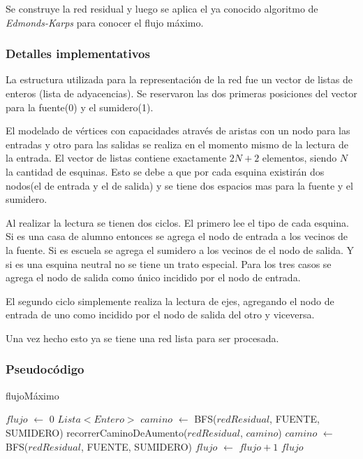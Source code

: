 Se construye la red residual y luego se aplica el ya conocido algoritmo de \textit{Edmonds-Karps} para conocer el flujo máximo.

\subsubsection*{Detalles implementativos}

La estructura utilizada para la representación de la red fue un vector de listas de enteros (lista de adyacencias). Se reservaron las dos primeras posiciones del vector para la fuente(0) y el sumidero(1).

El modelado de vértices con capacidades através de aristas con un nodo para las entradas y otro para las salidas se realiza en el momento mismo de la lectura de la entrada. El vector de listas contiene exactamente $2N + 2$ elementos, siendo $N$ la cantidad de esquinas. Esto se debe a que por cada esquina existirán dos nodos(el de entrada y el de salida) y se tiene dos espacios mas para la fuente y el sumidero.

Al realizar la lectura se tienen dos ciclos. El primero lee el tipo de cada esquina. Si es una casa de alumno entonces se agrega el nodo de entrada a los vecinos de la fuente. Si es escuela se agrega el sumidero a los vecinos de el nodo de salida. Y si es una esquina neutral no se tiene un trato especial. Para los tres casos se agrega el nodo de salida como único incidido por el nodo de entrada.

El segundo ciclo simplemente realiza la lectura de ejes, agregando el nodo de entrada de uno como incidido por el nodo de salida del otro y viceversa.

Una vez hecho esto ya se tiene una red lista para ser procesada.

\subsubsection*{Pseudocódigo}


\begin{algorithm}[]
	\caption{flujoMáximo}

	$flujo$ $\gets$ 0 \;
	$Lista<Entero>$ $camino$ $\gets$ BFS($redResidual$, FUENTE, SUMIDERO) \;
	 {
		recorrerCaminoDeAumento($redResidual$, $camino$) \;
		$camino$ $\gets$ BFS($redResidual$, FUENTE, SUMIDERO) \;
		$flujo$ $\gets$ $flujo + 1$ \;
	}
	\Return $flujo$ \;
\end{algorithm}

